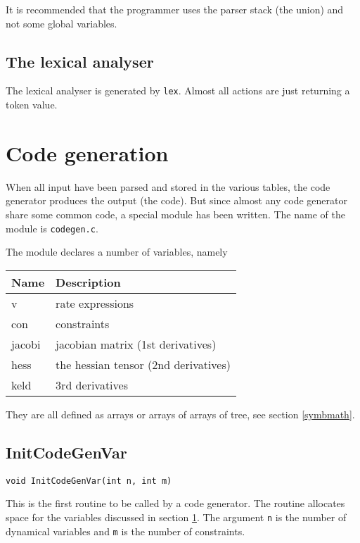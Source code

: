 It is recommended that the programmer uses the parser stack (\ie the
union) and not some global variables.

\subsection{The lexical analyser}
The lexical analyser is generated by {\tt lex}. Almost all actions are just
returning a token value.

\newpage
\section{Code generation}
\label{codegen}
When all input have been parsed and stored in the various tables, the
code generator produces the output (the code). But since almost any
code generator share some common code, a special module has been
written. The name of the module is {\tt codegen.c}.

The module declares a number of variables, namely

\vspace{0.2cm}
\begin{center}
\begin{tabular}{ll}
\hline
Name   & Description \\ \hline
v      & rate expressions \\
con    & constraints \\
jacobi & jacobian matrix (1st derivatives) \\ 
hess   & the hessian tensor (2nd derivatives) \\
keld   & 3rd derivatives \\
\hline
\end{tabular}
\end{center}
\vspace{0.2cm}

They are all defined as arrays or arrays of arrays of tree, see
section \ref{symbmath}.

\subsection{InitCodeGenVar}
\begin{verbatim}
void InitCodeGenVar(int n, int m)
\end{verbatim}

This is the first routine to be called by a code generator. The
routine allocates space for the variables discussed in section
\ref{codegen}. The argument {\tt n} is the number of dynamical
variables and {\tt m} is the number of constraints.

